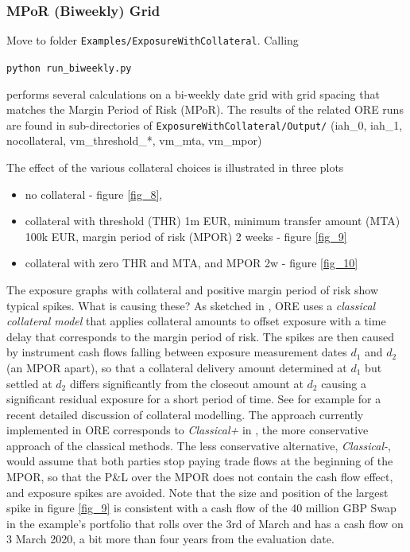 \subsubsection{MPoR (Biweekly) Grid}

Move to folder {\tt Examples/ExposureWithCollateral}. Calling

\medskip
\centerline{\tt python run\_biweekly.py } 
\medskip

performs several calculations on a bi-weekly date grid with grid spacing that matches the Margin Period of Risk (MPoR).
The results of the related ORE runs are found in sub-directories of {\tt ExposureWithCollateral/Output/} (iah\_0, iah\_1,
nocollateral, vm\_threshold\_*, vm\_mta, vm\_mpor)

The effect of the various collateral choices is illustrated in three plots
\begin{itemize}
\item no collateral - figure \ref{fig_8},
\item collateral with threshold (THR) 1m EUR, minimum transfer amount (MTA) 100k EUR, margin period of risk (MPOR) 2
  weeks - figure \ref{fig_9}
\item collateral with zero THR and MTA, and MPOR 2w - figure \ref{fig_10}
\end{itemize}
The exposure graphs with collateral and positive margin period of risk show typical spikes. What is causing these? As
sketched in \cite{methods}, ORE uses a {\em classical collateral model} that applies collateral
amounts to offset exposure with a time delay that corresponds to the margin period of risk. The spikes are then caused
by instrument cash flows falling between exposure measurement dates $d_1$ and $d_2$ (an MPOR apart), so that a
collateral delivery amount determined at $d_1$ but settled at $d_2$ differs significantly from the closeout amount at
$d_2$ causing a significant residual exposure for a short period of time. See for example \cite{Andersen2016} for a
recent detailed discussion of collateral modelling. The approach currently implemented in ORE corresponds to {\em
  Classical+} in \cite{Andersen2016}, the more conservative approach of the classical methods. The less conservative
alternative, {\em Classical-}, would assume that both parties stop paying trade flows at the beginning of the MPOR, so
that the P\&L over the MPOR does not contain the cash flow effect, and exposure spikes are avoided. Note that the size
and position of the largest spike in figure \ref{fig_9} is consistent with a cash flow of the 40 million GBP Swap in the
example's portfolio that rolls over the 3rd of March and has a cash flow on 3 March 2020, a bit more than four years
from the evaluation date.
  
